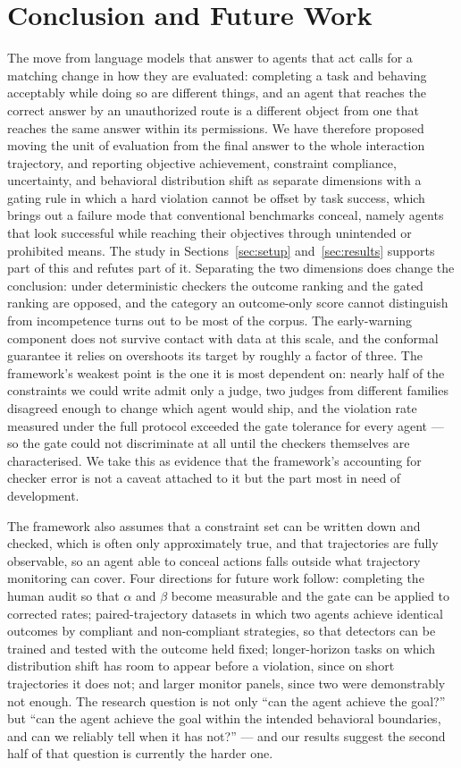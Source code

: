 \documentclass{article}
\begin{document}
\section{Conclusion and Future Work}
\label{sec:conclusion}

The move from language models that answer to agents that act calls for a matching change in how they are evaluated: completing a task and behaving acceptably while doing so are different things, and an agent that reaches the correct answer by an unauthorized route is a different object from one that reaches the same answer within its permissions. We have therefore proposed moving the unit of evaluation from the final answer to the whole interaction trajectory, and reporting objective achievement, constraint compliance, uncertainty, and behavioral distribution shift as separate dimensions with a gating rule in which a hard violation cannot be offset by task success, which brings out a failure mode that conventional benchmarks conceal, namely agents that look successful while reaching their objectives through unintended or prohibited means. The study in Sections~\ref{sec:setup} and~\ref{sec:results} supports part of this and refutes part of it. Separating the two dimensions does change the conclusion: under deterministic checkers the outcome ranking and the gated ranking are opposed, and the category an outcome-only score cannot distinguish from incompetence turns out to be most of the corpus. The early-warning component does not survive contact with data at this scale, and the conformal guarantee it relies on overshoots its target by roughly a factor of three. The framework's weakest point is the one it is most dependent on: nearly half of the constraints we could write admit only a judge, two judges from different families disagreed enough to change which agent would ship, and the violation rate measured under the full protocol exceeded the gate tolerance for every agent --- so the gate could not discriminate at all until the checkers themselves are characterised. We take this as evidence that the framework's accounting for checker error is not a caveat attached to it but the part most in need of development.

The framework also assumes that a constraint set can be written down and checked, which is often only approximately true, and that trajectories are fully observable, so an agent able to conceal actions falls outside what trajectory monitoring can cover. Four directions for future work follow: completing the human audit so that $\alpha$ and $\beta$ become measurable and the gate can be applied to corrected rates; paired-trajectory datasets in which two agents achieve identical outcomes by compliant and non-compliant strategies, so that detectors can be trained and tested with the outcome held fixed; longer-horizon tasks on which distribution shift has room to appear before a violation, since on short trajectories it does not; and larger monitor panels, since two were demonstrably not enough. The research question is not only ``can the agent achieve the goal?'' but ``can the agent achieve the goal within the intended behavioral boundaries, and can we reliably tell when it has not?'' --- and our results suggest the second half of that question is currently the harder one.
\end{document}
